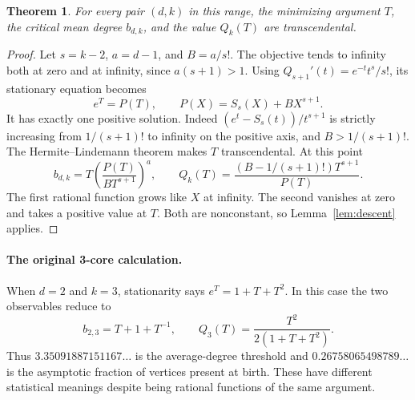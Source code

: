 \documentclass[11pt,a4paper]{article}
\newtheorem{theorem}{Theorem}[section]
\theoremstyle{definition}
\theoremstyle{remark}
\begin{document}
\par\hypertarget{cat-G01}{}\label{page:G01}\hypertarget{cat-G02}{}\label{page:G02}\hypertarget{cat-G03}{}\label{page:G03}\hypertarget{cat-G04}{}\label{page:G04}\hypertarget{cat-G05}{}\label{page:G05}\hypertarget{cat-G06}{}\label{page:G06}\hypertarget{cat-G07}{}\label{page:G07}\hypertarget{cat-G08}{}\label{page:G08}\hypertarget{cat-G09}{}\label{page:G09}\hypertarget{cat-G10}{}\label{page:G10}
\begin{theorem}\label{thm:gcore}
For every pair $(d,k)$ in this range, the minimizing argument $T$, the
critical mean degree $b_{d,k}$, and the value $Q_k(T)$ are transcendental.
\end{theorem}
\begin{proof}
Let $s=k-2$, $a=d-1$, and $B=a/s!$. The objective tends to infinity
both at zero and at infinity, since $a(s+1)>1$.
Using $Q_{s+1}'(t)=e^{-t}t^s/s!$, its stationary equation becomes
\[
 e^T=P(T),\qquad P(X)=S_s(X)+BX^{s+1}.
\]
It has exactly one positive solution. Indeed
$(e^t-S_s(t))/t^{s+1}$ is strictly increasing from $1/(s+1)!$ to
infinity on the positive axis, and $B>1/(s+1)!$.
The Hermite--Lindemann theorem makes $T$ transcendental. At this point
\[
 b_{d,k}=T\left(\frac{P(T)}{BT^{s+1}}\right)^a,\qquad
 Q_k(T)=\frac{(B-1/(s+1)!)T^{s+1}}{P(T)} .
\]
The first rational function grows like $X$ at infinity. The second
vanishes at zero and takes a positive value at $T$. Both are nonconstant,
so Lemma~\ref{lem:descent} applies.
\end{proof}

\paragraph{The original 3-core calculation.}
When $d=2$ and $k=3$, stationarity says $e^T=1+T+T^2$.
In this case the two observables reduce to
\[
   b_{2,3}=T+1+T^{-1},\qquad Q_3(T)=\frac{T^2}{2(1+T+T^2)} .
\]
Thus $3.35091887151167\ldots$ is the average-degree threshold and
$0.26758065498789\ldots$ is the asymptotic fraction of vertices present
at birth. These have different statistical meanings despite being
rational functions of the same argument.
\end{document}
